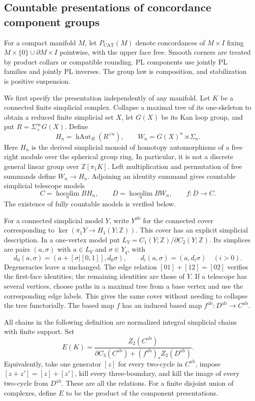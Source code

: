 \subsection{Countable presentations of concordance component groups}

For a compact manifold $M$, let $P_{\mathrm{CAT}}(M)$ denote
concordances of $M\times I$ fixing
$M\times\{0\}\cup\partial M\times I$ pointwise, with the upper
face free.  Smooth corners are treated by product collars or compatible
rounding.  PL components use jointly PL families and jointly PL inverses.
The group law is composition, and stabilization is positive suspension.

We first specify the presentation independently of any manifold.  Let
$K$ be a connected finite simplicial complex.  Collapse a maximal tree
of its one-skeleton to obtain a reduced finite simplicial set $X$, let
$G(X)$ be its Kan loop group, and put $R=\Sigma^\infty_+G(X)$.
Define
\[
 H_n=\operatorname{hAut}_R(R^{\vee n}),\qquad
 W_n=G(X)^n\rtimes\Sigma_n.
\]
Here $H_n$ is the derived simplicial monoid of homotopy automorphisms
of a free right module over the spherical group ring.  In particular,
it is not a discrete general linear group over $\mathbb Z[\pi_1K]$.
Left multiplication and permutation of free summands define
$W_n\to H_n$.  Adjoining an identity summand gives countable simplicial
telescope models
\[
 C=\operatorname*{hocolim}_n BH_n,\qquad
 D=\operatorname*{hocolim}_n BW_n,\qquad f:D\longrightarrow C.
\]
The existence of fully countable models is verified below.

For a connected simplicial model $Y$, write $Y^{\mathrm{ab}}$ for the
connected cover corresponding to
$\ker(\pi_1Y\to H_1(Y;\mathbb Z))$.  This cover has an explicit
simplicial description.  In a one-vertex model put
$L_Y=C_1(Y;\mathbb Z)/\partial C_2(Y;\mathbb Z)$.  Its simplices
are pairs $(a,\sigma)$ with $a\in L_Y$ and $\sigma\in Y_q$, with
\[
 d_0(a,\sigma)=(a+[\sigma|[0,1]],d_0\sigma),
 \qquad d_i(a,\sigma)=(a,d_i\sigma)\quad(i>0).
\]
Degeneracies leave $a$ unchanged.  The edge relation
$[01]+[12]=[02]$ verifies the first-face identities; the remaining
identities are those of $Y$.  If a telescope has several vertices,
choose paths in a maximal tree from a base vertex and use the
corresponding edge labels.  This gives the same cover without needing
to collapse the tree functorially.  The based map $f$ has an induced
based map $f^{\mathrm{ab}}:D^{\mathrm{ab}}\to C^{\mathrm{ab}}$.

All chains in the following definition are normalized integral
simplicial chains with finite support.  Set
\begin{equation}\label{eq:countable-concordance-presentation}
 E(K)=
 \frac{Z_2(C^{\mathrm{ab}})}
 {\partial C_3(C^{\mathrm{ab}})
        +(f^{\mathrm{ab}})_*Z_2(D^{\mathrm{ab}})}.
\end{equation}
Equivalently, take one generator $[z]$ for every two-cycle in
$C^{\mathrm{ab}}$, impose $[z+z']=[z]+[z']$, kill every three-boundary,
and kill the image of every two-cycle from $D^{\mathrm{ab}}$.
These are all the relations.  For a finite disjoint union of complexes,
define $E$ to be the product of the component presentations.


